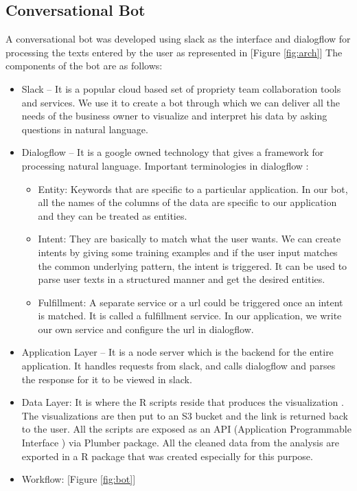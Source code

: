 \documentclass[12pt]{article}
\begin{document}
\subsection{Conversational Bot}
A conversational bot was developed using slack as the interface and dialogflow for processing the texts entered by the user as represented in [Figure \ref{fig:arch}]
The components of the bot are as follows:
\begin{itemize}
    \item Slack – It is a popular cloud based set of propriety team collaboration tools and services. We use it to create a bot through which we can deliver all the needs of the business owner to visualize and interpret his data by asking questions in natural language.
    \item Dialogflow – It is a google owned technology that gives a framework for processing natural language.
    Important terminologies in dialogflow :
\begin{itemize}
\item Entity:  Keywords that are specific to a particular application. In our bot, all the names of the columns of the data are specific to our application and they can be treated as entities. 

\item Intent: They are basically to match what the user wants. We can create intents by giving some training examples and if the user input matches the common underlying pattern, the intent is triggered. It can be used to parse user texts in a structured manner and get the desired entities.

\item Fulfillment:  A separate service or a url could be triggered once an intent is matched. It is called a fulfillment service. In our application, we write our own service and configure the url in dialogflow.
\end{itemize}
\item Application Layer – It is a node server which is the backend for the entire application. It handles requests from slack, and calls dialogflow and parses the response for it to be viewed in slack.
\item Data Layer:  It is where the R scripts reside that produces the visualization . The visualizations are then put to an S3 bucket and the link is returned back to the user. All the scripts are exposed as an API (Application Programmable Interface ) via Plumber package. All the cleaned data from the analysis are exported in a R package that was created especially for this purpose. 
\item Workflow: [Figure \ref{fig:bot}]
\end{itemize}
\end{document}
